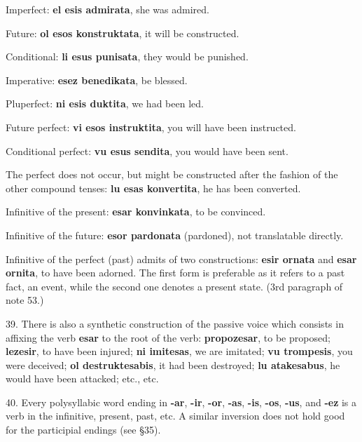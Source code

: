 Imperfect: \textbf{el esis admirata}, she was admired. 

Future: \textbf{ol esos konstruktata}, it will be constructed.

Conditional: \textbf{li esus punisata}, they would be punished. 

Imperative: \textbf{esez benedikata}, be blessed. 

Pluperfect: \textbf{ni esis duktita}, we had been led. 

Future perfect: \textbf{vi esos instruktita}, you will have been instructed. 

Conditional perfect: \textbf{vu esus sendita}, you would have been sent. 

The perfect does not occur, but might be constructed after the fashion of the other compound tenses: \textbf{lu esas konvertita}, he has been converted. 

Infinitive of the present: \textbf{esar konvinkata}, to be convinced. 

Infinitive of the future: \textbf{esor pardonata} (pardoned), not translatable directly. 

Infinitive of the perfect (past) admits of two constructions: \textbf{esir ornata} and \textbf{esar ornita}, to have been adorned. The first form is preferable as it refers to a past fact, an event, while the second one denotes a present state. (3rd paragraph of note 53.)

39. There is also a synthetic construction of the passive voice which consists in affixing the verb \textbf{esar} to the root of the verb: \textbf{propozesar}, to be proposed; \textbf{lezesir}, to have been injured; \textbf{ni imitesas}, we are imitated; \textbf{vu trompesis}, you were deceived; \textbf{ol destruktesabis}, it had been destroyed; \textbf{lu atakesabus}, he would have been attacked; etc., etc. 

40. Every polysyllabic word ending in \textbf{-ar}, \textbf{-ir}, \textbf{-or}, \textbf{-as}, \textbf{-is}, \textbf{-os}, \textbf{-us}, and \textbf{-ez} is a verb in the infinitive, present, past, etc. A similar inversion does not hold good for the participial endings (see §35). 

